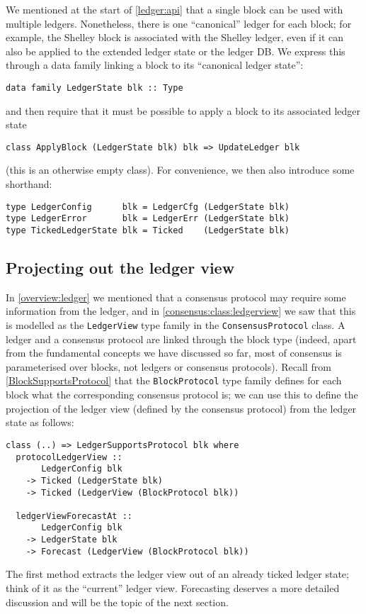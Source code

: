 We mentioned at the start of \cref{ledger:api} that a single block can be used
with multiple ledgers. Nonetheless, there is one ``canonical'' ledger for each
block; for example, the Shelley block is associated with the Shelley ledger,
even if it can also be applied to the extended ledger state or the ledger
DB. We express this through a data family linking a block to its ``canonical
ledger state'':
%
\begin{lstlisting}
data family LedgerState blk :: Type
\end{lstlisting}
%
and then require that it must be possible to apply a block to its associated
ledger state
%
\begin{lstlisting}
class ApplyBlock (LedgerState blk) blk => UpdateLedger blk
\end{lstlisting}
%
(this is an otherwise empty class). For convenience, we then also introduce
some shorthand:
%
\begin{lstlisting}
type LedgerConfig      blk = LedgerCfg (LedgerState blk)
type LedgerError       blk = LedgerErr (LedgerState blk)
type TickedLedgerState blk = Ticked    (LedgerState blk)
\end{lstlisting}

\subsection{Projecting out the ledger view}
\label{ledger:api:LedgerSupportsProtocol}

In \cref{overview:ledger} we mentioned that a consensus protocol may require
some information from the ledger, and in \cref{consensus:class:ledgerview} we
saw that this is modelled as the \lstinline!LedgerView! type family in the
\lstinline!ConsensusProtocol! class. A ledger and a consensus protocol are
linked through the block type (indeed, apart from the fundamental concepts we
have discussed so far, most of consensus is parameterised over blocks, not
ledgers or consensus protocols). Recall from \cref{BlockSupportsProtocol} that
the \lstinline!BlockProtocol! type family defines for each block what the
corresponding consensus protocol is; we can use this to define the projection of
the ledger view (defined by the consensus protocol) from the ledger state as
follows:
%
\begin{lstlisting}
class (..) => LedgerSupportsProtocol blk where
  protocolLedgerView ::
       LedgerConfig blk
    -> Ticked (LedgerState blk)
    -> Ticked (LedgerView (BlockProtocol blk))

  ledgerViewForecastAt ::
       LedgerConfig blk
    -> LedgerState blk
    -> Forecast (LedgerView (BlockProtocol blk))
\end{lstlisting}
%
The first method extracts the ledger view out of an already ticked ledger state;
think of it as the ``current'' ledger view. Forecasting deserves a more detailed
discussion and will be the topic of the next section.

